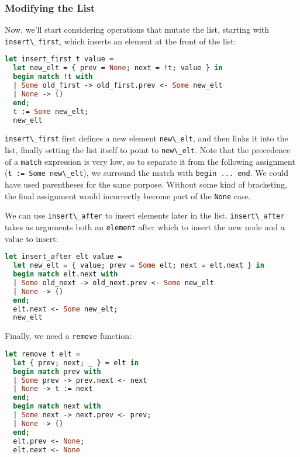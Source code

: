 \hypertarget{modifying-the-list}{%
\subsubsection{Modifying the List}\label{modifying-the-list}}

Now, we'll start considering operations that mutate the list, starting
with \passthrough{\lstinline!insert\_first!}, which inserts an element
at the front of the list: 

\begin{lstlisting}[language=Caml]
let insert_first t value =
  let new_elt = { prev = None; next = !t; value } in
  begin match !t with
  | Some old_first -> old_first.prev <- Some new_elt
  | None -> ()
  end;
  t := Some new_elt;
  new_elt
\end{lstlisting}

\passthrough{\lstinline!insert\_first!} first defines a new element
\passthrough{\lstinline!new\_elt!}, and then links it into the list,
finally setting the list itself to point to
\passthrough{\lstinline!new\_elt!}. Note that the precedence of a
\passthrough{\lstinline!match!} expression is very low, so to separate
it from the following assignment
(\passthrough{\lstinline!t := Some new\_elt!}), we surround the match
with \passthrough{\lstinline!begin ... end!}. We could have used
parentheses for the same purpose. Without some kind of bracketing, the
final assignment would incorrectly become part of the
\passthrough{\lstinline!None!} case. 

We can use \passthrough{\lstinline!insert\_after!} to insert elements
later in the list. \passthrough{\lstinline!insert\_after!} takes as
arguments both an \passthrough{\lstinline!element!} after which to
insert the new node and a value to insert:

\begin{lstlisting}[language=Caml]
let insert_after elt value =
  let new_elt = { value; prev = Some elt; next = elt.next } in
  begin match elt.next with
  | Some old_next -> old_next.prev <- Some new_elt
  | None -> ()
  end;
  elt.next <- Some new_elt;
  new_elt
\end{lstlisting}

Finally, we need a \passthrough{\lstinline!remove!} function:

\begin{lstlisting}[language=Caml]
let remove t elt =
  let { prev; next; _ } = elt in
  begin match prev with
  | Some prev -> prev.next <- next
  | None -> t := next
  end;
  begin match next with
  | Some next -> next.prev <- prev;
  | None -> ()
  end;
  elt.prev <- None;
  elt.next <- None
\end{lstlisting}

